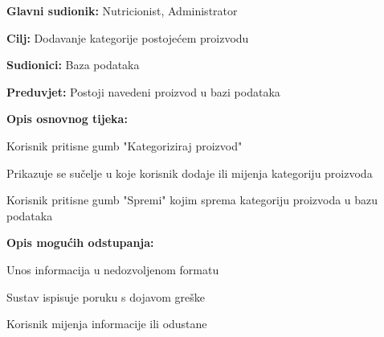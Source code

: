                     \noindent {}
                    \begin{packed_item}
    
                        \item \textbf{Glavni sudionik: }Nutricionist, Administrator
                        \item  \textbf{Cilj:} Dodavanje kategorije postojećem proizvodu
                        \item  \textbf{Sudionici:} Baza podataka
                        \item  \textbf{Preduvjet:} Postoji navedeni proizvod u bazi podataka
                        \item  \textbf{Opis osnovnog tijeka:} 
                        
                        \item[] \begin{packed_enum}
    
                            \item Korisnik pritisne gumb "Kategoriziraj proizvod"
                            \item Prikazuje se sučelje u koje korisnik dodaje ili mijenja kategoriju proizvoda
                            \item Korisnik pritisne gumb "Spremi" kojim sprema kategoriju proizvoda u bazu podataka
                        \end{packed_enum}
                        
                        \item  \textbf{Opis mogućih odstupanja:}
                        
                        \item[] \begin{packed_item}
    
                            \item[2.a] Unos informacija u nedozvoljenom formatu
                            \item[] \begin{packed_enum}
                                
                                \item Sustav ispisuje poruku s dojavom greške
                                \item Korisnik mijenja informacije ili odustane
                                
                            \end{packed_enum}

                            
                        \end{packed_item}
                    \end{packed_item}

